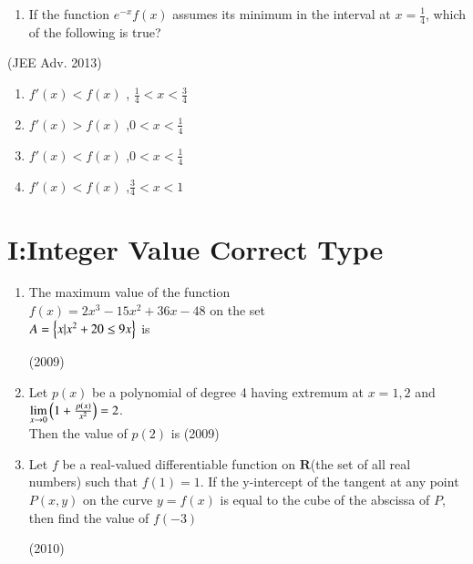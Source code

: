 \documentclass[journal,,12pt,twocolumn]{IEEEtran}
\theoremstyle{remark}
\begin{document}
\begin{enumerate}
\begin{enumerate}
\end{enumerate}


\item If the function $e^{-x}f(x)$ assumes its minimum in the interval  at $x=\frac{1}{4}$, which of the following is true?
\end{enumerate}

\hfill{(JEE Adv. 2013)}

\begin{enumerate}

\item $f'(x)<f(x)$ , $\frac{1}{4}<x<\frac{3}{4}$ \\

\item $f'(x)>f(x)$ ,$0<x<\frac{1}{4}$ \\ 

\item $f'(x)<f(x)$ ,$0<x<\frac{1}{4}$ \\

\item $f'(x)<f(x)$ ,$\frac{3}{4}<x<1$ \\


\end{enumerate}


\section*{I:Integer Value Correct Type}

\begin{enumerate}
\item The maximum value of the function \\
$f(x)=2x^3-15x^2+36x-48$ on the set\\
$A=\left\{x|x^2+20 \le 9x\right\}$ is

\hfill {(2009)}

\item Let $p(x)$ be a polynomial of degree 4 having extremum at $x=1,2 $ and $\lim \limits_{x\to 0} \left(1+\frac{p(x)}{x^2}\right) = 2$.\\
Then the value of $p(2)$ is
\hfill{(2009)}
\item Let $f$ be a real-valued differentiable function on $\textbf{R}$(the set of all real numbers) such that $f(1)=1$. If the y-intercept of the tangent at any point $P(x,y)$ on the curve $y=f(x)$ is equal to the cube of the abscissa of $P$, then find the value of $f(-3)$

    \hfill {(2010)}


\end{enumerate}
\end{document}
